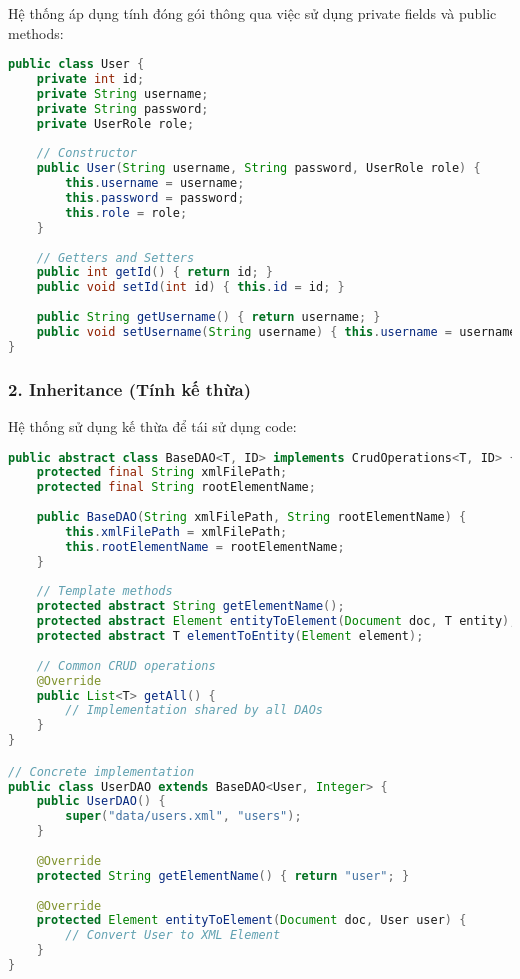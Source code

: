 \documentclass[12pt,a4paper]{article}
\begin{document}
Hệ thống áp dụng tính đóng gói thông qua việc sử dụng private fields và public methods:

\begin{lstlisting}[language=Java, caption=Ví dụ về Encapsulation trong class User]
public class User {
    private int id;
    private String username;
    private String password;
    private UserRole role;
    
    // Constructor
    public User(String username, String password, UserRole role) {
        this.username = username;
        this.password = password;
        this.role = role;
    }
    
    // Getters and Setters
    public int getId() { return id; }
    public void setId(int id) { this.id = id; }
    
    public String getUsername() { return username; }
    public void setUsername(String username) { this.username = username; }
}
\end{lstlisting}

\subsubsection{2. Inheritance (Tính kế thừa)}

Hệ thống sử dụng kế thừa để tái sử dụng code:

\begin{lstlisting}[language=Java, caption=Ví dụ về Inheritance với BaseDAO]
public abstract class BaseDAO<T, ID> implements CrudOperations<T, ID> {
    protected final String xmlFilePath;
    protected final String rootElementName;
    
    public BaseDAO(String xmlFilePath, String rootElementName) {
        this.xmlFilePath = xmlFilePath;
        this.rootElementName = rootElementName;
    }
    
    // Template methods
    protected abstract String getElementName();
    protected abstract Element entityToElement(Document doc, T entity);
    protected abstract T elementToEntity(Element element);
    
    // Common CRUD operations
    @Override
    public List<T> getAll() {
        // Implementation shared by all DAOs
    }
}

// Concrete implementation
public class UserDAO extends BaseDAO<User, Integer> {
    public UserDAO() {
        super("data/users.xml", "users");
    }
    
    @Override
    protected String getElementName() { return "user"; }
    
    @Override
    protected Element entityToElement(Document doc, User user) {
        // Convert User to XML Element
    }
}
\end{lstlisting}
\end{document}
